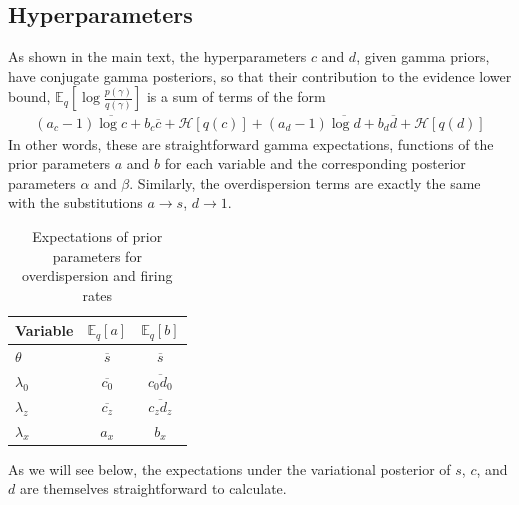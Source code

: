 \documentclass[10pt,letterpaper]{article}
\begin{document}
\subsection{Hyperparameters}
As shown in the main text, the hyperparameters $c$ and $d$, given gamma priors, have conjugate gamma posteriors, so that their contribution to the evidence lower bound, $\mathbb{E}_q \left[\log \frac{p(\gamma)}{q(\gamma)} \right]$ is a sum of terms of the form
\begin{align}
    (a_{c} - 1) \overline{\log c} + b_{c} \overline{c} + \mathcal{H}[q(c)] +
    (a_{d} - 1) \overline{\log d} + b_{d} \overline{d} + \mathcal{H}[q(d)]
\end{align}
In other words, these are straightforward gamma expectations, functions of the prior parameters $a$ and $b$ for each variable and the corresponding posterior parameters $\alpha$ and $\beta$. Similarly, the overdispersion terms are exactly the same with the substitutions $a \rightarrow s$, $d\rightarrow 1$.

\begin{table}[ht]
\caption{Expectations of prior parameters for overdispersion and firing rates}
\label{expectation_table}
\begin{center}
\begin{tabular}{lcc}
\multicolumn{1}{c}{\bf Variable}  &\multicolumn{1}{c}{\bf $\mathbb{E}_q[a]$} &\multicolumn{1}{c}{\bf $\mathbb{E}_q[b]$}
\\ \hline
$\theta$ &$\overline{s}$ &$\overline{s}$ \\
$\lambda_0$ &$\overline{c_0}$ &$\overline{c_0 d_0}$ \\
$\lambda_z$ &$\overline{c_z}$ &$\overline{c_z d_z}$ \\
$\lambda_x$ &$a_x$ &$b_x$ \\
\end{tabular}
\end{center}
\end{table}
As we will see below, the expectations under the variational posterior of $s$, $c$, and $d$ are themselves straightforward to calculate.
\end{document}
